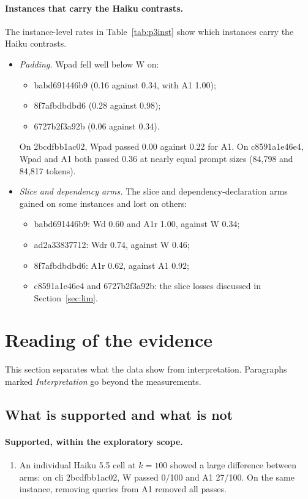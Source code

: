 \paragraph{Instances that carry the Haiku contrasts.} The instance-level rates in Table~\ref{tab:p3inst} show which instances carry the Haiku contrasts.
\begin{itemize}
\item \emph{Padding.} Wpad fell well below W on:
  \begin{itemize}
  \item babd691446b9 (0.16 against 0.34, with A1 1.00);
  \item 8f7afbdbdbd6 (0.28 against 0.98);
  \item 6727b2f3a92b (0.06 against 0.34).
  \end{itemize}
  On 2bcdfbb1ac02, Wpad passed 0.00 against 0.22 for A1. On c8591a1e46e4, Wpad and A1 both passed 0.36 at nearly equal prompt sizes (84,798 and 84,817 tokens).
\item \emph{Slice and dependency arms.} The slice and dependency-declaration arms gained on some instances and lost on others:
  \begin{itemize}
  \item babd691446b9: Wd 0.60 and A1r 1.00, against W 0.34;
  \item ad2a33837712: Wdr 0.74, against W 0.46;
  \item 8f7afbdbdbd6: A1r 0.62, against A1 0.92;
  \item c8591a1e46e4 and 6727b2f3a92b: the slice losses discussed in Section~\ref{sec:lim}.
  \end{itemize}
\end{itemize}

\section{Reading of the evidence}

This section separates what the data show from interpretation. Paragraphs marked \emph{Interpretation} go beyond the measurements.

\subsection{What is supported and what is not}

\paragraph{Supported, within the exploratory scope.}
\begin{enumerate}
\item An individual Haiku 5.5 cell at $k=100$ showed a large difference between arms: on cli 2bcdfbb1ac02, W passed 0/100 and A1 27/100. On the same instance, removing queries from A1 removed all passes.
\end{enumerate}

